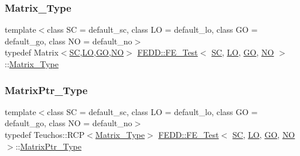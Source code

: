 \mbox{\label{classFEDD_1_1FE__Test_ab21a3d554ec8bf6763a7dabcbe800b35}} 
\subsubsection{\texorpdfstring{Matrix\+\_\+\+Type}{Matrix\_Type}}
{\footnotesize\ttfamily template$<$class SC  = default\+\_\+sc, class LO  = default\+\_\+lo, class GO  = default\+\_\+go, class NO  = default\+\_\+no$>$ \\
typedef Matrix$<$\hyperlink{fe__test__laplace_8cpp_a79c7e86a57edbb2a5a53242bcd04e41e}{SC},\hyperlink{fe__test__laplace_8cpp_ad6a38c9f07d3fd633eefca5bccad8410}{LO},\hyperlink{fe__test__laplace_8cpp_afa2946b509009b4f45eb04bd8c5b27d9}{GO},\hyperlink{fe__test__laplace_8cpp_a5e24f37b28787429872b6ecb1d0417ce}{NO}$>$ \hyperlink{classFEDD_1_1FE__Test}{F\+E\+D\+D\+::\+F\+E\+\_\+\+Test}$<$ \hyperlink{fe__test__laplace_8cpp_a79c7e86a57edbb2a5a53242bcd04e41e}{SC}, \hyperlink{fe__test__laplace_8cpp_ad6a38c9f07d3fd633eefca5bccad8410}{LO}, \hyperlink{fe__test__laplace_8cpp_afa2946b509009b4f45eb04bd8c5b27d9}{GO}, \hyperlink{fe__test__laplace_8cpp_a5e24f37b28787429872b6ecb1d0417ce}{NO} $>$\+::\hyperlink{classFEDD_1_1FE__Test_ab21a3d554ec8bf6763a7dabcbe800b35}{Matrix\+\_\+\+Type}}

\mbox{\label{classFEDD_1_1FE__Test_a3c2e34afc3a1495c2b00313399f12b3d}} 
\subsubsection{\texorpdfstring{Matrix\+Ptr\+\_\+\+Type}{MatrixPtr\_Type}}
{\footnotesize\ttfamily template$<$class SC  = default\+\_\+sc, class LO  = default\+\_\+lo, class GO  = default\+\_\+go, class NO  = default\+\_\+no$>$ \\
typedef Teuchos\+::\+R\+CP$<$\hyperlink{classFEDD_1_1FE__Test_ab21a3d554ec8bf6763a7dabcbe800b35}{Matrix\+\_\+\+Type}$>$ \hyperlink{classFEDD_1_1FE__Test}{F\+E\+D\+D\+::\+F\+E\+\_\+\+Test}$<$ \hyperlink{fe__test__laplace_8cpp_a79c7e86a57edbb2a5a53242bcd04e41e}{SC}, \hyperlink{fe__test__laplace_8cpp_ad6a38c9f07d3fd633eefca5bccad8410}{LO}, \hyperlink{fe__test__laplace_8cpp_afa2946b509009b4f45eb04bd8c5b27d9}{GO}, \hyperlink{fe__test__laplace_8cpp_a5e24f37b28787429872b6ecb1d0417ce}{NO} $>$\+::\hyperlink{classFEDD_1_1FE__Test_a3c2e34afc3a1495c2b00313399f12b3d}{Matrix\+Ptr\+\_\+\+Type}}

